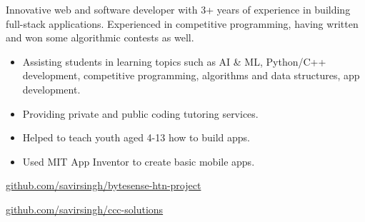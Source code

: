 \documentclass[8pt,a4paper]{altacv}
\begin{document}




Innovative web and software developer with 3+ years of experience in building full-stack applications.
Experienced in competitive programming, having written and won some algorithmic contests as well.



\begin{itemize}
\item Assisting students in learning topics such as AI \& ML, Python/C++ development, competitive programming, algorithms and data structures, app development.
\item Providing private and public coding tutoring services.
\end{itemize}

\divider

\begin{itemize}
\item Helped to teach youth aged 4-13 how to build apps.
\item Used MIT App Inventor to create basic mobile apps.
\end{itemize}

\divider
\smallskip

\href{https://github.com/savirsingh/bytesense-htn-project}
{github.com/savirsingh/bytesense-htn-project}

\divider

\divider

\href{https://github.com/savirsingh/ccc-solutions}{github.com/savirsingh/ccc-solutions}
\end{document}
